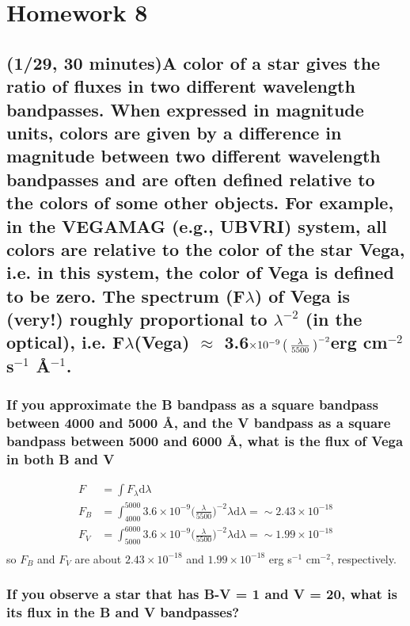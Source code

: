 \documentclass[12pt]{article}
\begin{document}
\section*{Homework 8}
\date{01/29/2016}
\subsection*{
(1/29, 30 minutes)A color of a star gives the ratio of fluxes in two
different wavelength bandpasses. When expressed in magnitude units,
colors are given by a difference in magnitude between two different
wavelength bandpasses and are often defined relative to the colors of
some other objects. For example, in the VEGAMAG (e.g., UBVRI) system,
all colors are relative to the color of the star Vega, i.e. in this
system, the color of Vega is defined to be zero. The spectrum
(F$\scriptstyle \lambda$) of Vega is (very!) roughly proportional to $
\lambda^{{-2}}_{}$ (in the optical), i.e. F$\scriptstyle
\lambda$(Vega) $ \approx$ 3.6$\times10^{-9} \left(\vphantom{{\lambda\over
5500}}\right.$$ {\lambda\over 5500}$$ \left.\vphantom{{\lambda\over
5500}}\right)^{{-2}}_{}$erg cm$^{-2}$ s$^{-1}$ \AA{}$^{-1}$.}

\subsubsection{
If you approximate the B bandpass as a square bandpass between 4000
and 5000 \AA{}, and the V bandpass as a square bandpass between 5000 and
6000 \AA{}, what is the flux of Vega in both B and V}

\begin{align*}
    F &= \int F_{\lambda}\textrm{d}\lambda\\
    F_B &= \int_{4000}^{5000} 3.6\times10^{-9}
    \Big(\frac{\lambda}{5500}\Big)^{-2}\lambda\textrm{d}\lambda
    = \sim2.43\times10^{-18}\\
    F_V &= \int_{5000}^{6000} 3.6\times10^{-9}
    \Big(\frac{\lambda}{5500}\Big)^{-2}\lambda\textrm{d}\lambda
    = \sim1.99\times10^{-18}\\
\end{align*}
so $F_B$ and $F_V$ are about $2.43\times10^{-18}$ and $1.99\times10^{-18}$ 
erg s$^{-1}$ cm$^{-2}$, respectively.

\subsubsection{
If you observe a star that has B-V = 1 and V = 20, what is its flux
in the B and V bandpasses?}
\end{document}
